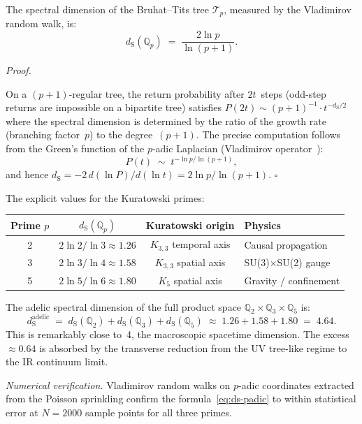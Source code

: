 \documentclass[11pt, a4paper, openany]{book}
\newcommand{\dS}{d_{\mathrm{S}}}
\newcounter{thm}[chapter]
\renewenvironment{proof}[1][Proof]{%
  \par\noindent\textit{#1.}\quad
}{\hfill$\square$\par\medskip}
\begin{document}
\begin{theorem}\label{thm:ds-padic}
The spectral dimension of the Bruhat--Tits tree $\mathcal{T}_p$,
measured by the Vladimirov random walk, is:
\begin{equation}
  \dS(\mathbb{Q}_p) \;=\; \frac{2\ln p}{\ln(p+1)}.
  \label{eq:ds-padic}
\end{equation}
\end{theorem}

\begin{proof}
On a $(p+1)$-regular tree, the return probability after $2t$~steps
(odd-step returns are impossible on a bipartite tree) satisfies
$P(2t) \sim (p+1)^{-1} \cdot t^{-\dS/2}$ where the spectral
dimension is determined by the ratio of the growth rate
(branching factor~$p$) to the degree~$(p+1)$.
The precise computation follows from the Green's function of the
$p$-adic Laplacian (Vladimirov
operator~\cite{vladimirov1994,kochubei2001}):
\[
  P(t) \;\sim\; t^{-\ln p / \ln(p+1)},
\]
and hence $\dS = -2\,d(\ln P)/d(\ln t) = 2\ln p / \ln(p+1)$.
\end{proof}

\noindent The explicit values for the Kuratowski primes:
\begin{center}
\renewcommand{\arraystretch}{1.2}
\begin{tabular}{cccl}
\toprule
Prime $p$ & $\dS(\mathbb{Q}_p)$ & Kuratowski origin & Physics \\
\midrule
2 & $2\ln 2/\ln 3 \approx 1.26$ & $K_{3,3}$ temporal axis
  & Causal propagation \\
3 & $2\ln 3/\ln 4 \approx 1.58$ & $K_{3,3}$ spatial axis
  & SU(3)$\times$SU(2) gauge \\
5 & $2\ln 5/\ln 6 \approx 1.80$ & $K_5$ spatial axis
  & Gravity / confinement \\
\bottomrule
\end{tabular}
\end{center}

\medskip\noindent
The adelic spectral dimension of the full product space
$\mathbb{Q}_2 \times \mathbb{Q}_3 \times \mathbb{Q}_5$ is:
\[
  \dS^{\mathrm{adelic}} \;=\;
  \dS(\mathbb{Q}_2) + \dS(\mathbb{Q}_3) + \dS(\mathbb{Q}_5)
  \;\approx\; 1.26 + 1.58 + 1.80 \;=\; 4.64.
\]
This is remarkably close to~4, the macroscopic spacetime
dimension. The excess $\approx 0.64$ is absorbed by the transverse
reduction from the UV tree-like regime to the IR continuum limit.

\noindent\textit{Numerical verification.}\enspace
Vladimirov random walks on $p$-adic coordinates extracted from the
Poisson sprinkling confirm the formula~\eqref{eq:ds-padic} to
within statistical error at $N = 2000$ sample points for all three
primes.
\end{document}
